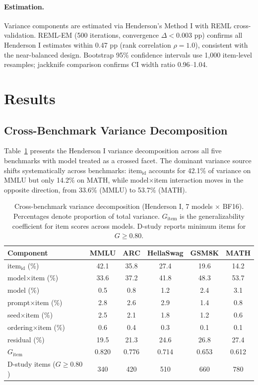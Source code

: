 \documentclass[letterpaper,11pt]{article}
\begin{document}
\paragraph{Estimation.}
Variance components are estimated via Henderson's Method I with REML cross-validation.
REML-EM (500 iterations, convergence $\Delta < 0.003$ pp) confirms all Henderson I estimates within 0.47 pp (rank correlation $\rho = 1.0$), consistent with the near-balanced design.
Bootstrap 95\% confidence intervals use 1,000 item-level resamples; jackknife comparison confirms CI width ratio 0.96--1.04.

\section{Results}

\subsection{Cross-Benchmark Variance Decomposition}
\label{sec:crossbenchmark}

Table~\ref{tab:crossbenchmark} presents the Henderson I variance decomposition across all five benchmarks with model treated as a crossed facet.
The dominant variance source shifts systematically across benchmarks: item$_{\text{id}}$ accounts for 42.1\% of variance on MMLU but only 14.2\% on MATH, while model$\times$item interaction moves in the opposite direction, from 33.6\% (MMLU) to 53.7\% (MATH).

\begin{table}[t]
\centering
\caption{Cross-benchmark variance decomposition (Henderson I, 7 models $\times$ BF16). Percentages denote proportion of total variance. $G_{\text{item}}$ is the generalizability coefficient for item scores across models. D-study reports minimum items for $G \geq 0.80$.}
\label{tab:crossbenchmark}
\small
\begin{tabular}{lccccc}
\toprule
\textbf{Component} & \textbf{MMLU} & \textbf{ARC} & \textbf{HellaSwag} & \textbf{GSM8K} & \textbf{MATH} \\
\midrule
item$_{\text{id}}$ (\%) & 42.1 & 35.8 & 27.4 & 19.6 & 14.2 \\
model$\times$item (\%) & 33.6 & 37.2 & 41.8 & 48.3 & 53.7 \\
model (\%) & 0.5 & 0.8 & 1.2 & 2.4 & 3.1 \\
prompt$\times$item (\%) & 2.8 & 2.6 & 2.9 & 1.4 & 0.8 \\
seed$\times$item (\%) & 2.5 & 2.1 & 1.8 & 1.2 & 0.6 \\
ordering$\times$item (\%) & 0.6 & 0.4 & 0.3 & 0.1 & 0.1 \\
residual (\%) & 19.5 & 21.3 & 24.6 & 26.8 & 27.4 \\
\midrule
$G_{\text{item}}$ & 0.820 & 0.776 & 0.714 & 0.653 & 0.612 \\
D-study items ($G \geq 0.80$) & 340 & 420 & 510 & 660 & 780 \\
\bottomrule
\end{tabular}
\end{table}
\end{document}
